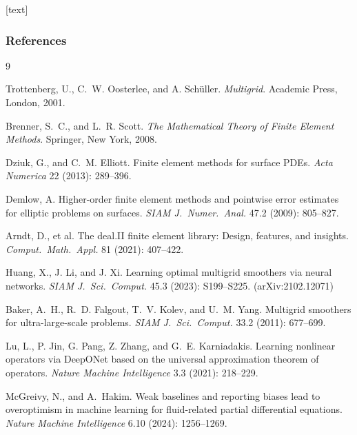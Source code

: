 [text]
\frametitle{References}
\footnotesize
\begin{thebibliography}{9}

Trottenberg, U., C.~W. Oosterlee, and A. Sch\"uller. \emph{Multigrid}.
Academic Press, London, 2001.

Brenner, S.~C., and L.~R. Scott. \emph{The Mathematical Theory of Finite Element
Methods}. Springer, New York, 2008.

Dziuk, G., and C.~M. Elliott. Finite element methods for surface PDEs.
\emph{Acta Numerica} 22 (2013): 289--396.

Demlow, A. Higher-order finite element methods and pointwise error estimates for
elliptic problems on surfaces. \emph{SIAM J.\ Numer.\ Anal.} 47.2 (2009): 805--827.

Arndt, D., et al. The deal.II finite element library: Design, features, and
insights. \emph{Comput.\ Math.\ Appl.} 81 (2021): 407--422.

Huang, X., J. Li, and J. Xi. Learning optimal multigrid smoothers via neural
networks. \emph{SIAM J.\ Sci.\ Comput.} 45.3 (2023): S199--S225.
(arXiv:2102.12071)

Baker, A.~H., R.~D. Falgout, T.~V. Kolev, and U.~M. Yang. Multigrid smoothers for
ultra-large-scale problems. \emph{SIAM J.\ Sci.\ Comput.} 33.2 (2011): 677--699.

Lu, L., P. Jin, G. Pang, Z. Zhang, and G.~E. Karniadakis. Learning nonlinear
operators via DeepONet based on the universal approximation theorem of operators.
\emph{Nature Machine Intelligence} 3.3 (2021): 218--229.

McGreivy, N., and A.~Hakim. Weak baselines and reporting biases lead to
overoptimism in machine learning for fluid-related partial differential equations.
\emph{Nature Machine Intelligence} 6.10 (2024): 1256--1269.

\end{thebibliography}
